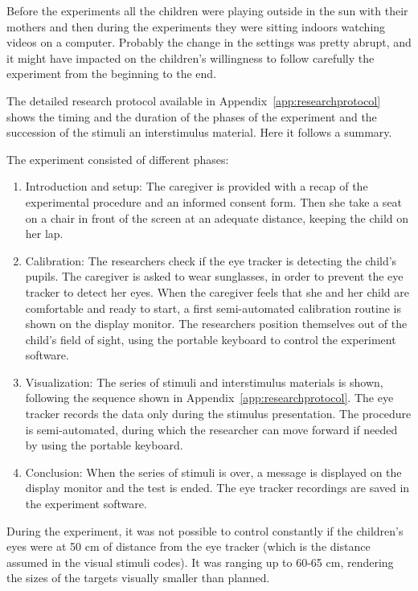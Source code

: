 Before the experiments all the children were playing outside in the sun with their mothers and then during the experiments they were sitting indoors watching videos on a computer. Probably the change in the settings was pretty abrupt, and it might have impacted on the children’s willingness to follow carefully the experiment from the beginning to the end.

The detailed research protocol available in Appendix~\ref{app:researchprotocol} shows the timing and the duration of the phases of the experiment and the succession of the stimuli an interstimulus material. Here it follows a summary.

The experiment consisted of different phases:
\begin{enumerate}
    \item Introduction and setup: The caregiver is provided with a recap of the experimental procedure and an informed consent form. Then she take a seat on a chair in front of the screen at an adequate distance, keeping the child on her lap.
    \item Calibration: The researchers check if the eye tracker is detecting the child’s pupils. The caregiver is asked to wear sunglasses, in order to prevent the eye tracker to detect her eyes. When the caregiver feels that she and her child are comfortable and ready to start, a first semi-automated calibration routine is shown on the display monitor. The researchers position themselves out of the child’s field of sight, using the portable keyboard to control the experiment software.
    \item Visualization: The series of stimuli and interstimulus materials is shown, following the sequence shown in Appendix~\ref{app:researchprotocol}. The eye tracker records the data only during the stimulus presentation. The procedure is semi-automated, during which the researcher can move forward if needed by using the portable keyboard.
    \item Conclusion: When the series of stimuli is over, a message is displayed on the display monitor and the test is ended. The eye tracker recordings are saved in the experiment software.
\end{enumerate}

During the experiment, it was not possible to control constantly if the children’s eyes were at 50 cm of distance from the eye tracker (which is the distance assumed in the visual stimuli codes). It was ranging up to 60-65 cm, rendering the sizes of the targets visually smaller than planned.
